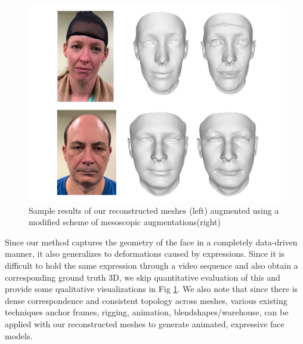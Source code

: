 \documentclass[10pt,twocolumn,letterpaper]{article}
\begin{document}
 \begin{figure}[t]
\begin{center}
   \includegraphics[width=0.8\linewidth]{images/high_freq.png}
\end{center}
   \caption{Sample results of our reconstructed meshes (left) augmented using a modified scheme of mesoscopic augmentations(right)}
\label{fig:expressions}
\end{figure}

Since our method captures the geometry of the face in a completely data-driven manner, it also generalizes to deformations caused by expressions. 
Since it is difficult to hold the same expression through a video sequence and also obtain a corresponding ground truth 3D, we skip quantitative evaluation of this and provide some qualitative visualizations in Fig \ref{fig:expressions}. 
We also note that since there is dense correspondence and consistent topology across meshes, various existing techniques \cite{}  anchor frames, rigging, animation, blendshapes/warehouse, can be applied with our reconstructed meshes to generate animated, expressive face models.
\end{document}
